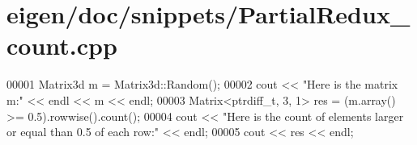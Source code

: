 \hypertarget{eigen_2doc_2snippets_2_partial_redux__count_8cpp_source}{}\section{eigen/doc/snippets/\+Partial\+Redux\+\_\+count.cpp}
\label{eigen_2doc_2snippets_2_partial_redux__count_8cpp_source}

\begin{DoxyCode}
00001 Matrix3d m = Matrix3d::Random();
00002 cout << \textcolor{stringliteral}{"Here is the matrix m:"} << endl << m << endl;
00003 Matrix<ptrdiff\_t, 3, 1> res = (m.array() >= 0.5).rowwise().count();
00004 cout << \textcolor{stringliteral}{"Here is the count of elements larger or equal than 0.5 of each row:"} << endl;
00005 cout << res << endl;
\end{DoxyCode}
